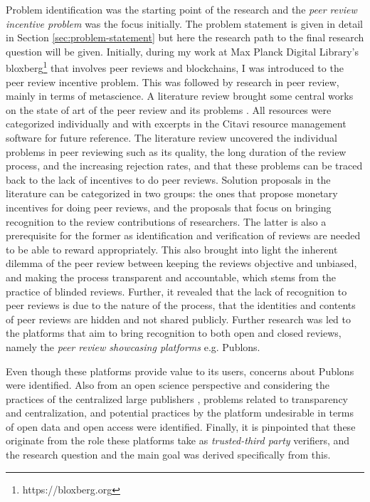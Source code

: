 Problem identification was the starting point of the research and the \textit{peer review incentive problem} was the focus initially. The problem statement is given in detail in Section \ref{sec:problem-statement} but here the research path to the final research question will be given. Initially, during my work at Max Planck Digital Library's bloxberg\footnote{https://bloxberg.org} that involves peer reviews and blockchains, I was introduced to the peer review incentive problem. This was followed by research in peer review, mainly in terms of metascience. A literature review brought some central works on the state of art of the peer review and its problems \parencite{Bornmann.2011, Ferreira.2016, HorbachS.P.J.M..2018, Tennant.2018, Tennant.2017, Tennant.2017, Publons.2018, Kovanis.2016, Moxham.2018, RossHellauer.2017b, RossHellauer.2017, Ware.2008}. All resources were categorized individually and with excerpts in the Citavi resource management software for future reference. The literature review uncovered the individual problems in peer reviewing such as its quality, the long duration of the review process, and the increasing rejection rates, and that these problems can be traced back to the lack of incentives to do peer reviews. Solution proposals in the literature can be categorized in two groups: the ones that propose monetary incentives for doing peer reviews, and the proposals that focus on bringing recognition to the review contributions of researchers. The latter is also a prerequisite for the former as identification and verification of reviews are needed to be able to reward appropriately. This also brought into light the inherent dilemma of the peer review between keeping the reviews objective and unbiased, and making the process transparent and accountable, which stems from the practice of blinded reviews. Further, it revealed that the lack of recognition to peer reviews is due to the nature of the process, that the identities and contents of peer reviews are hidden and not shared publicly. Further research was led to the platforms that aim to bring recognition to both open and closed reviews, namely the \textit{peer review showcasing platforms} e.g. Publons. 

Even though these platforms provide value to its users, concerns about Publons were identified. Also from an open science perspective and considering the practices of the centralized large publishers \parencite{Lariviere.2015}, problems related to transparency and centralization, and potential practices by the platform undesirable in terms of open data and open access were identified. Finally, it is pinpointed that these originate from the role these platforms take as \textit{trusted-third party} verifiers, and the research question and the main goal was derived specifically from this. 


